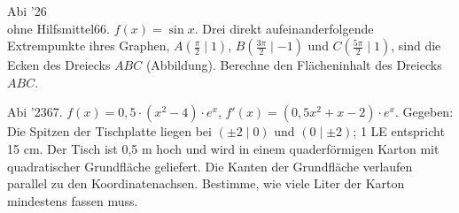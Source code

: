 \documentclass[11pt]{article}
\begin{document}
\begin{pfaufg}{Abi ’26\\ohne Hilfsmittel}{66.}{}
$f(x) = \sin x$. Drei direkt aufeinanderfolgende Extrempunkte ihres Graphen, $A\left(\tfrac{\pi}{2} \mid 1\right)$, $B\left(\tfrac{3\pi}{2} \mid -1\right)$ und $C\left(\tfrac{5\pi}{2} \mid 1\right)$, sind die Ecken des Dreiecks $ABC$ (Abbildung). Berechne den Flächeninhalt des Dreiecks $ABC$.
\par\smallskip\noindent {}\par
{}
\end{pfaufg}
\pfgruppe{}
\begin{pfaufg}{Abi ’23}{67.}{}
$f(x) = 0{,}5\cdot(x^2 - 4)\cdot e^x$, $f'(x) = (0{,}5x^2 + x - 2)\cdot e^x$. Gegeben: Die Spitzen der Tischplatte liegen bei $(\pm 2 \mid 0)$ und $(0 \mid \pm 2)$; 1 LE entspricht 15 cm. Der Tisch ist 0,5 m hoch und wird in einem quaderförmigen Karton mit quadratischer Grundfläche geliefert. Die Kanten der Grundfläche verlaufen parallel zu den Koordinatenachsen. Bestimme, wie viele Liter der Karton mindestens fassen muss.
\end{pfaufg}
\pfgruppe{}
\end{document}
